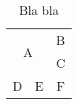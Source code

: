 \documentclass{article}
\begin{document}
\begin{table}
  \centering
  \begin{tabular}{ccc}
    \multicolumn{2}{c}{\multirow[t]{2}{*}[-.77ex]{\Large{A}}} & B \\
    & & C \\
    D & E & F  \\
  \end{tabular}
  \caption{Bla bla}
\end{table}
\end{document}
